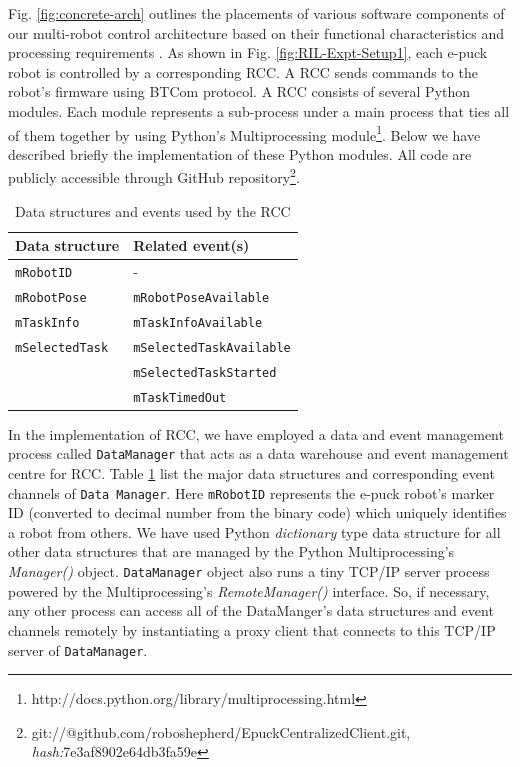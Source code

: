 \documentclass[final,5p,times,twocolumn]{elsarticle}
\begin{document}
Fig. \ref{fig:concrete-arch} outlines the placements of various software components of our multi-robot control architecture based on their functional characteristics and processing requirements \cite{Sarker2010control}. As shown in Fig. \ref{fig:RIL-Expt-Setup1}, each e-puck robot is controlled by a corresponding RCC. A RCC sends commands to the robot's firmware using BTCom protocol. A RCC consists of several Python modules. Each module represents a sub-process under a main process that ties all of them together by using Python's Multiprocessing module\footnote{http://docs.python.org/library/multiprocessing.html}. Below we have described briefly the implementation of these Python modules. All code are publicly accessible through GitHub repository\footnote{git://@github.com/roboshepherd/EpuckCentralizedClient.git,    
\textit{hash:}7e3af8902e64db3fa59e}.
\begin{table}
\caption{Data structures and events used by the RCC}
\begin{center}
\begin{tabular}{|l|l|}
\hline \textbf{Data structure} & \textbf{Related event(s)}\\ 
\hline \texttt{\texttt{mRobotID}} & - \\ 
\hline \texttt{mRobotPose} & \texttt{mRobotPoseAvailable}\\ 
\hline \texttt{mTaskInfo} & \texttt{mTaskInfoAvailable}\\ 
\hline \texttt{mSelectedTask} & \texttt{mSelectedTaskAvailable}\\
 &  \texttt{mSelectedTaskStarted}\\
 &  \texttt{mTaskTimedOut}\\
 \hline 
\end{tabular}
\end{center}
\label{table:data-mgr}
\end{table} 

In the implementation of RCC, we have employed a data and event management process called \texttt{DataManager} that acts as a data warehouse and event management centre for RCC. Table \ref{table:data-mgr} list the major data structures and corresponding event channels of \texttt{Data Manager}. Here \texttt{mRobotID} represents the e-puck robot's marker ID (converted to decimal number from the binary code) which uniquely identifies a robot from others.  We have used Python {\em dictionary} type data structure for all other data structures that are managed by the Python Multiprocessing's {\em Manager()} object.  \texttt{DataManager} object also runs a tiny TCP/IP server process powered by the Multiprocessing's {\em RemoteManager()} interface. So, if necessary,  any other process can access all of the DataManger's data structures and event channels remotely by instantiating a proxy client  that connects to this TCP/IP server of \texttt{DataManager}.
\end{document}
